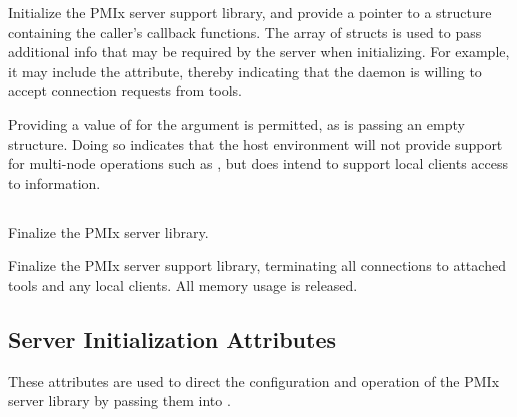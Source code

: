 \optattrend

\descr

Initialize the \ac{PMIx} server support library, and provide a pointer to a  structure containing the caller's callback functions.
The array of  structs is used to pass additional info that may be required by the server when initializing.
For example, it may include the  attribute, thereby indicating that the daemon is willing to accept connection requests from tools.

\advicermstart
Providing a value of  for the  argument is permitted, as is passing an empty  structure. Doing so indicates that the host environment will not provide support for multi-node operations such as , but does intend to support local clients access to information.
\advicermend

\subsection{}

\summary

Finalize the PMIx server library.

\format


\returnsimple

\descr

Finalize the \ac{PMIx} server support library, terminating all connections to attached tools and any local clients.
All memory usage is released.

\subsection{Server Initialization Attributes}
\label{chap:api_init:serverattrs}

These attributes are used to direct the configuration and operation of the \ac{PMIx} server library by passing them into .

